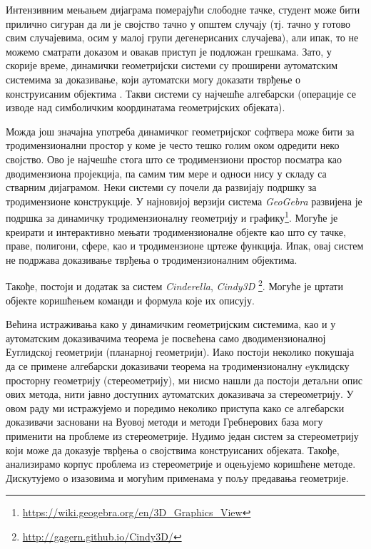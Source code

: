 Интензивним мењањем дијаграма померајући слободне тачке, студент може
бити прилично сигуран да ли је својство тачно у општем случају
(тј. тачно у готово свим случајевима, осим у малој групи дегенерисаних
случајева), али ипак, то не можемо сматрати доказом и овакав приступ
је подложан грешкама. Зато, у скорије време, динамички геометријски
системи су проширени аутоматским системима за доказивање, који
аутоматски могу доказати тврђење о конструисаним објектима
\cite{geogebra-provers}. Такви системи су најчешће алгебарски
(операције се изводе над симболичким координатама геометријских
објеката).

Можда још значајна употреба динамичког геометријског софтвера може
бити за тродимензионални простор у коме је често тешко голим оком
одредити неко својство. Ово је најчешће стога што се тродимензиони
простор посматра као дводимензиона пројекција, па самим тим мере и
односи нису у складу са стварним дијаграмом. Неки системи су почели да
развијају подршку за тродимензионе конструкције. У најновијој верзији
система \emph{GeoGebra} развијена је подршка за динамичку
тродимензионалну геометрију и
графику\footnote{\url{https://wiki.geogebra.org/en/3D_Graphics_View}}. Могуће
је креирати и интерактивно мењати тродимензионалне објекте као што су
тачке, праве, полигони, сфере, као и тродимензионе цртеже
функција. Ипак, овај систем не подржава доказивање тврђења о
тродимензионалним објектима.

Такође, постоји и додатак за систем \emph{Cinderella},
\emph{Cindy3D} \footnote{\url{http://gagern.github.io/Cindy3D/}}. Могуће
је цртати објекте коришћењем команди и формула које их описују.

Већина истраживања како у динамичким геометријским системима, као и у
аутоматским доказивачима теорема је посвећена само дводимензионалној
Еуглидској геометрији (планарној геометрији). Иако постоји неколико
покушаја да се примене алгебарски доказивачи теорема на
тродимензионалну eуклидску просторну геометрију (стереометрију), ми
нисмо нашли да постоји детаљни опис ових метода, нити јавно доступних
аутоматских доказивача за стереометрију. У овом раду ми истражујемо и
поредимо неколико приступа како се алгебарски доказивачи засновани на
Вуовој методи и методи Гребнерових база могу применити на проблеме из
стереометрије. Нудимо један систем за стереометрију који може да
доказује тврђења о својствима конструисаних објеката. Такође,
анализирамо корпус проблема из стереометрије и оцењујемо коришћене
методе. Дискутујемо о изазовима и могућим применама у пољу предавања
геометрије.

